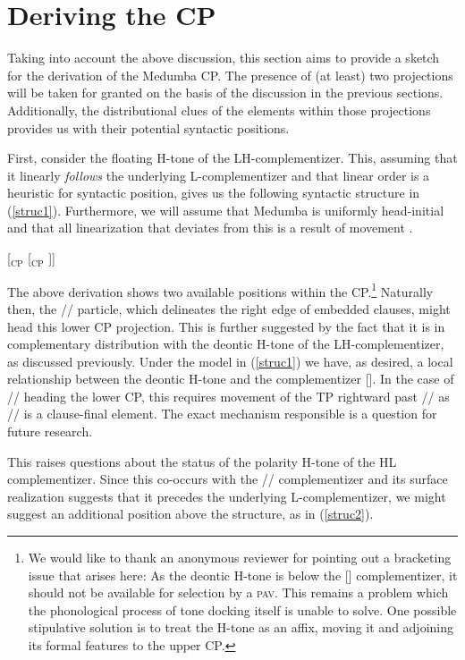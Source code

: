 \documentclass[output=paper,colorlinks,citecolor=brown]{langscibook}
\begin{document}
\section{Deriving the CP}

Taking into account the above discussion, this section aims to provide a sketch for the derivation of the Medumba CP. The presence of (at least) two projections will be taken for granted on the basis of the discussion in the previous sections. Additionally, the distributional clues of the elements within those projections provides us with their potential syntactic positions.

First, consider the floating H-tone of the LH-complementizer. This, assuming that it linearly \textit{follows} the underlying L-complementizer and that linear order is a heuristic for syntactic position, gives us the following syntactic structure in (\ref{struc1}). Furthermore, we will assume that Medumba is uniformly head-initial and that all linearization that deviates from this is a result of movement \citep{Kayne1994}.

\ea \label{struc1}
    {[$_{\text{CP}}$ \text{ {\mbuL} } [$_{\text{CP}}$ ]]}
\z

The above derivation shows two available positions within the CP.\footnote{We would like to thank an anonymous reviewer for pointing out a bracketing issue that arises here: As the deontic H-tone is below the [\mbuL] complementizer, it should not be available for selection by a \textsc{pav}. This remains a problem which the phonological process of tone docking itself is unable to solve. One possible stipulative solution is to treat the H-tone as an affix, moving it and adjoining its formal features to the upper CP.} Naturally then, the /\la/ particle, which delineates the right edge of embedded clauses, might head this lower CP projection. This is further suggested by the fact that it is in complementary distribution with the deontic H-tone of the LH-complementizer, as discussed previously. Under the model in (\ref{struc1}) we have, as desired, a local relationship between the deontic H-tone and the complementizer [\mbuL]. In the case of /\la/ heading the lower CP, this requires movement of the TP rightward past /\la/ as /\la/ is a clause-final element. The exact mechanism responsible is a question for future research.

This raises questions about the status of the polarity H-tone of the HL complementizer. Since this co-occurs with the /\la/ complementizer and its surface realization suggests that it precedes the underlying L-complementizer, we might suggest an additional position above the structure, as in (\ref{struc2}).
\end{document}
